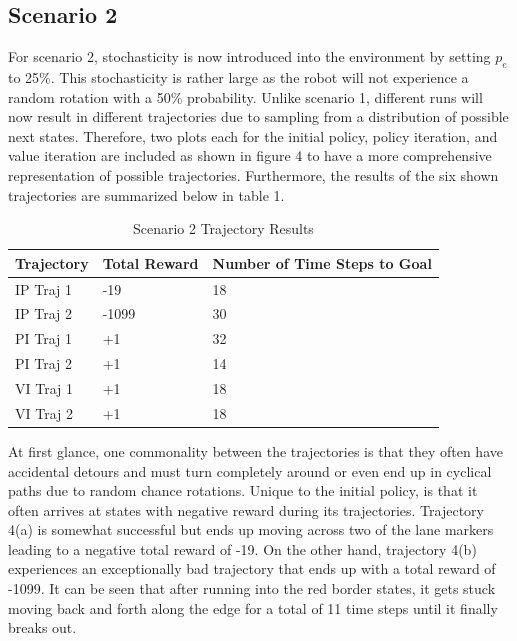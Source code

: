 \documentclass[fullpage]{article}
\begin{document}
\subsection{Scenario 2}

For scenario 2, stochasticity is now introduced into the environment by setting $p_e$ to 25\%. This stochasticity is rather large as the robot will not experience a random rotation with a 50\% probability. Unlike scenario 1, different runs will now result in different trajectories due to sampling from a distribution of possible next states. Therefore, two plots each for the initial policy, policy iteration, and value iteration are included as shown in figure 4 to have a more comprehensive representation of possible trajectories. Furthermore, the results of the six shown trajectories are summarized below in table 1.
\begin{table}[H]
\centering
\begin{tabular}{lll}
\hline
Trajectory & Total Reward & Number of Time Steps to Goal \\ \hline
IP Traj 1 & -19          & 18                           \\
IP Traj 2 & -1099           & 30                            \\
PI Traj 1 & +1           & 32                           \\
PI Traj 2 & +1           & 14                           \\
VI Traj 1 & +1           & 18                           \\
VI Traj 2 & +1           & 18                          
\end{tabular}
\caption{Scenario 2 Trajectory Results}
\end{table}

At first glance, one commonality between the trajectories is that they often have accidental detours and must turn completely around or even end up in cyclical paths due to random chance rotations. Unique to the initial policy, is that it often arrives at states with negative reward during its trajectories. Trajectory 4(a) is somewhat successful but ends up moving across two of the lane markers leading to a negative total reward of -19. On the other hand, trajectory 4(b) experiences an exceptionally bad trajectory that ends up with a total reward of -1099. It can be seen that after running into the red border states, it gets stuck moving back and forth along the edge for a total of 11 time steps until it finally breaks out.
\end{document}
